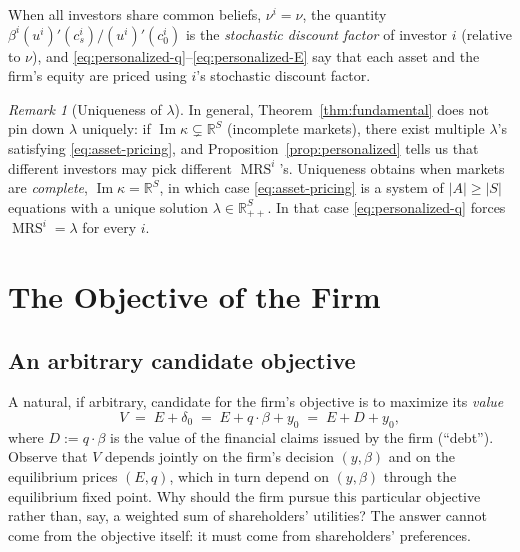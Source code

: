 \documentclass[11pt,a4paper]{article}
\def\R{\mathbb{R}}
\def\geq{\geqslant}
\DeclareMathOperator{\MRS}{MRS}
\DeclareMathOperator{\Range}{Im}
\theoremstyle{plain}
\theoremstyle{definition}
\theoremstyle{remark}
\newtheorem{remark}[theorem]{Remark}
\begin{document}
When all investors share common beliefs, $\nu^i=\nu$, the quantity $\beta^i(u^i)'(c^i_s)/(u^i)'(c^i_0)$ is the \emph{stochastic discount factor} of investor $i$ (relative to $\nu$), and \eqref{eq:personalized-q}--\eqref{eq:personalized-E} say that each asset and the firm's equity are priced using $i$'s stochastic discount factor.

\begin{remark}[Uniqueness of $\lambda$]\label{rem:unique-lambda}
In general, Theorem~\ref{thm:fundamental} does not pin down $\lambda$ uniquely: if $\Range\kappa \subsetneq \R^S$ (incomplete markets), there exist multiple $\lambda$'s satisfying \eqref{eq:asset-pricing}, and Proposition~\ref{prop:personalized} tells us that different investors may pick different $\MRS^i$'s. Uniqueness obtains when markets are \emph{complete}, $\Range\kappa = \R^S$, in which case \eqref{eq:asset-pricing} is a system of $|A|\geq |S|$ equations with a unique solution $\lambda\in\R^S_{++}$. In that case \eqref{eq:personalized-q} forces $\MRS^i = \lambda$ for every $i$.
\end{remark}

\section{The Objective of the Firm}

\subsection{An arbitrary candidate objective}

A natural, if arbitrary, candidate for the firm's objective is to maximize its \emph{value}
\begin{equation}\label{eq:firm-value}
  V \;=\; E + \delta_0 \;=\; E + q\cdot\beta + y_0 \;=\; E + D + y_0,
\end{equation}
where $D:=q\cdot\beta$ is the value of the financial claims issued by the firm (``debt''). Observe that $V$ depends jointly on the firm's decision $(y,\beta)$ and on the equilibrium prices $(E,q)$, which in turn depend on $(y,\beta)$ through the equilibrium fixed point. Why should the firm pursue this particular objective rather than, say, a weighted sum of shareholders' utilities? The answer cannot come from the objective itself: it must come from shareholders' preferences.
\end{document}
